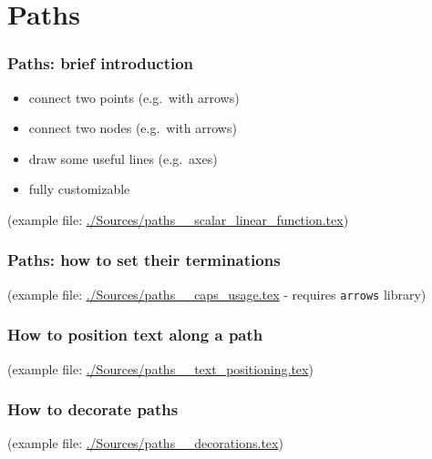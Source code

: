 \section{Paths}
\label{sec:paths}





\begin{frame}
	\frametitle{Paths: brief introduction}
	\begin{itemize}
		\item connect two points (e.g.\ with arrows)
		\item connect two nodes (e.g.\ with arrows)
		\item draw some useful lines (e.g.\ axes)
		\item fully customizable
	\end{itemize}
	(example file: \url{./Sources/paths__scalar_linear_function.tex})
	
\end{frame}






\begin{frame}
	\frametitle{Paths: how to set their terminations}
	(example file: \url{./Sources/paths__caps_usage.tex} - requires \texttt{arrows} library)
	
\end{frame}






\begin{frame}
	\frametitle{How to position text along a path}
	(example file: \url{./Sources/paths__text_positioning.tex})
	
\end{frame}

 



\begin{frame}
	\frametitle{How to decorate paths}
	(example file: \url{./Sources/paths__decorations.tex})
	
\end{frame}


 
 
 
